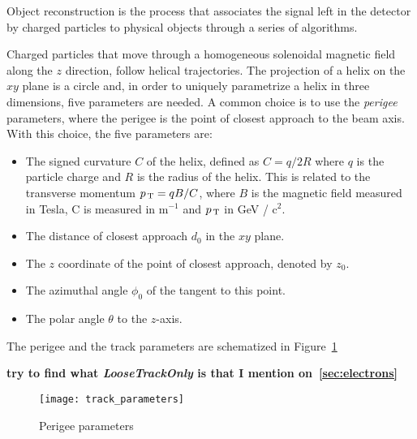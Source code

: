 Object reconstruction is the process that associates the signal left in the
detector by charged particles to physical objects through a series of
algorithms.

Charged particles that move through a homogeneous solenoidal magnetic field
along the $z$ direction, follow helical trajectories. The projection of a helix
on the $xy$ plane is a circle and, in order to uniquely parametrize a helix in
three dimensions, five parameters are needed. A common choice is to use the
\emph{perigee} parameters, where the perigee is the point of closest approach to
the beam axis. With this choice, the five parameters are:
\begin{itemize}
\item The signed curvature $C$ of the helix, defined as $C = q / 2R$ where $q$ is
  the particle charge and $R$ is the radius of the helix. This is related to the
  transverse momentum $p_\mathrm{\, T} = qB / C$, where $B$ is the magnetic field measured
  in Tesla, C is measured in m$^{-1}$ and $p_\mathrm{\, T}$ in GeV / c$^2$.
\item The distance of closest approach $d_0$ in the $xy$ plane.
\item The $z$ coordinate of the point of closest approach, denoted by $z_0$.
\item The azimuthal angle $\phi_0$ of the tangent to this point.
\item The polar angle $\theta$ to the $z$-axis.
\end{itemize}
The perigee and the track parameters are schematized in Figure~\ref{fig:track_par}

\mbox{}

\textbf{try to find what \emph{LooseTrackOnly} is that I mention
  on~\autoref{sec:electrons}}
\begin{figure}[!h]
  \centering
    \texttt{[image: track\_parameters]}
    \caption{Perigee parameters}
    \label{fig:track_par}
\end{figure}
